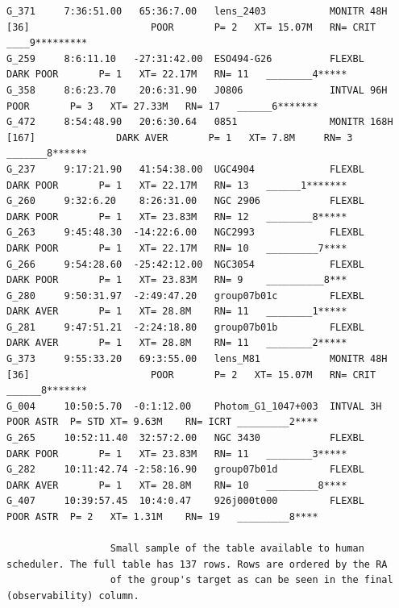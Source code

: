 \begin{landscape}
\begin{verbatim}
G_371     7:36:51.00   65:36:7.00   lens_2403           MONITR 48H [36]                     POOR       P= 2   XT= 15.07M   RN= CRIT ____9*********
G_259     8:6:11.10   -27:31:42.00  ESO494-G26          FLEXBL                         DARK POOR       P= 1   XT= 22.17M   RN= 11   ________4*****
G_358     8:6:23.70    20:6:31.90   J0806               INTVAL 96H                          POOR       P= 3   XT= 27.33M   RN= 17   ______6*******
G_472     8:54:48.90   20:6:30.64   0851                MONITR 168H [167]              DARK AVER       P= 1   XT= 7.8M     RN= 3    _______8******
G_237     9:17:21.90   41:54:38.00  UGC4904             FLEXBL                         DARK POOR       P= 1   XT= 22.17M   RN= 13   ______1*******
G_260     9:32:6.20    8:26:31.00   NGC 2906            FLEXBL                         DARK POOR       P= 1   XT= 23.83M   RN= 12   ________8*****
G_263     9:45:48.30  -14:22:6.00   NGC2993             FLEXBL                         DARK POOR       P= 1   XT= 22.17M   RN= 10   _________7****
G_266     9:54:28.60  -25:42:12.00  NGC3054             FLEXBL                         DARK POOR       P= 1   XT= 23.83M   RN= 9    __________8***
G_280     9:50:31.97  -2:49:47.20   group07b01c         FLEXBL                         DARK AVER       P= 1   XT= 28.8M    RN= 11   ________1*****
G_281     9:47:51.21  -2:24:18.80   group07b01b         FLEXBL                         DARK AVER       P= 1   XT= 28.8M    RN= 11   ________2*****
G_373     9:55:33.20   69:3:55.00   lens_M81            MONITR 48H [36]                     POOR       P= 2   XT= 15.07M   RN= CRIT ______8*******
G_004     10:50:5.70  -0:1:12.00    Photom_G1_1047+003  INTVAL 3H                           POOR ASTR  P= STD XT= 9.63M    RN= ICRT _________2****
G_265     10:52:11.40  32:57:2.00   NGC 3430            FLEXBL                         DARK POOR       P= 1   XT= 23.83M   RN= 11   ________3*****
G_282     10:11:42.74 -2:58:16.90   group07b01d         FLEXBL                         DARK AVER       P= 1   XT= 28.8M    RN= 10   _________8****
G_407     10:39:57.45  10:4:0.47    926j000t000         FLEXBL                              POOR ASTR  P= 2   XT= 1.31M    RN= 19   _________8****

                  Small sample of the table available to human scheduler. The full table has 137 rows. Rows are ordered by the RA
                  of the group's target as can be seen in the final (observability) column. 
\end{verbatim}
\end{landscape}
\normalsize

